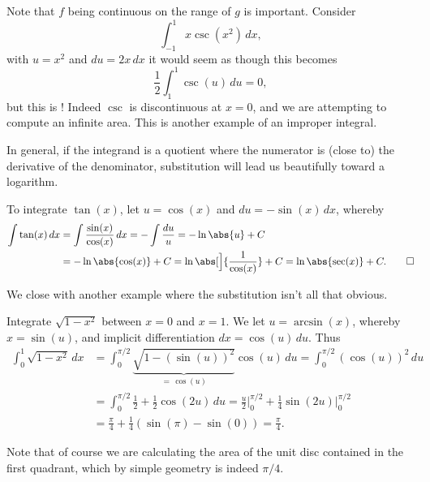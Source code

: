 \begin{remark}
	Note that $f$ being continuous on the range of $g$ is important. Consider
	\[
		\int_{-1}^1 x \csc(x^2) \, d x,
	\]
	with $u = x^2$ and $d u = 2 x \, d x$ it would seem as though this becomes
	\[
		\frac{1}{2} \int_1^1 \csc(u) \, d u = 0,
	\]
	but this is ! Indeed $\csc$ is discontinuous at $x = 0$, and we are attempting to compute an infinite area. This is another example of an improper integral.
\end{remark}

\noindent
In general, if the integrand is a quotient where the numerator is (close to) the derivative of the denominator, substitution will lead us beautifully toward a logarithm.

\begin{example}
	To integrate $\tan(x)$, let $u = \cos(x)$ and $d u = - \sin(x) \, d x$, whereby
	\begin{align*}
		\int \tan(x) \, d x & = \int \frac{\sin(x)}{\cos(x)} \, d x = - \int \frac{d u}{u} = - \ln\abs{u} + C                  \\
		                    & = - \ln\abs{\cos(x)} + C = \ln\abs[\Big]{\frac{1}{\cos(x)}} + C = \ln\abs{\sec(x)} + C. \qedhere
	\end{align*}
\end{example}

\noindent
We close with another example where the substitution isn't all that obvious.

\begin{example}
	Integrate $\sqrt{1 - x^2}$ between $x = 0$ and $x = 1$. We let $u = \arcsin(x)$, whereby $x = \sin(u)$, and implicit differentiation $d x = \cos(u) \, d u$. Thus
	\begin{align*}
		\int_0^1 \sqrt{1 - x^2} \, d x & = \int_0^{\pi/2} \underbrace{\sqrt{1 - (\sin(u))^2}}_{=\, \cos(u)} \cos(u) \, d u = \int_0^{\pi/2} (\cos(u))^2 \, d u                         \\
		                               & = \int_0^{\pi/2} \frac{1}{2} + \frac{1}{2} \cos(2 u) \, d u = \frac{u}{2} \Big \rvert_0^{\pi/2} + \frac{1}{4} \sin(2 u) \Big \rvert_0^{\pi/2} \\
		                               & = \frac{\pi}{4} + \frac{1}{4} (\sin(\pi) - \sin(0)) = \frac{\pi}{4}.
	\end{align*}

	\noindent
	Note that of course we are calculating the area of the unit disc contained in the first quadrant, which by simple geometry is indeed $\pi / 4$.
\end{example}

